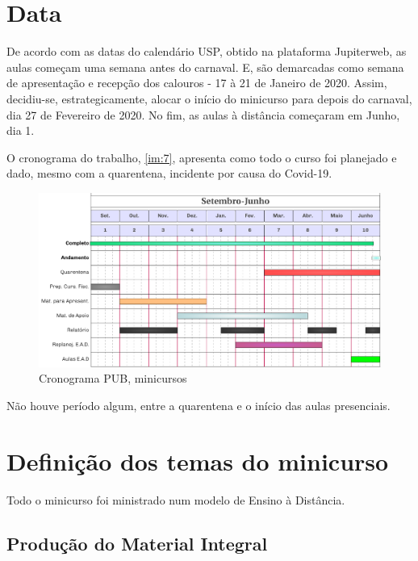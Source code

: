\documentclass[
12pt,				%
openright,			%
oneside,			%
a4paper,			%
english,			%
french,				%
spanish,			%
brazil,				%
]{abntex2}
\begin{document}
\section{Data}
De acordo com as datas do calendário USP, obtido na plataforma
Jupiterweb, as aulas começam uma semana antes do carnaval. E, são
demarcadas como semana de apresentação e recepção dos calouros - 17 à
21 de Janeiro de 2020. Assim,
decidiu-se, estrategicamente, alocar o início do minicurso para depois
do carnaval, dia 27 de Fevereiro de 2020. No fim, as aulas à distância começaram em Junho, dia
1.

O cronograma do trabalho, \autoref{im:7}, apresenta como todo o curso
foi planejado e dado, mesmo com a quarentena, incidente por causa do Covid-19.

\begin{figure}[!htb]
  \caption{\label{im:7} Cronograma PUB, minicursos}
  \begin{center}
    \includegraphics[scale=0.27]{./Imagens/9.png}
  \end{center}
\end{figure}

Não houve período algum, entre a quarentena e o início das aulas
presenciais.

\clearpage

\section{Definição dos temas do minicurso}

Todo o minicurso foi ministrado num modelo de
Ensino à Distância.

\subsection{Produção do Material Integral}
\end{document}

